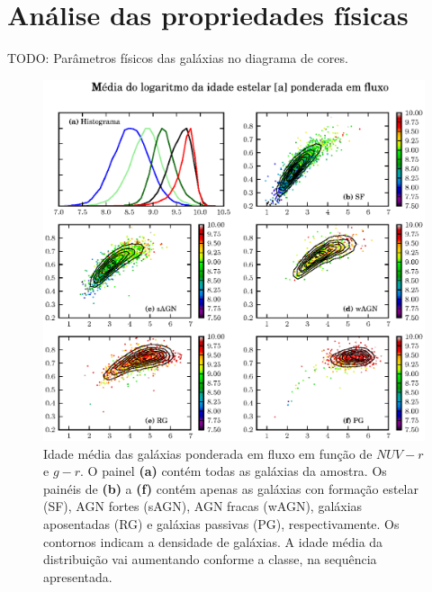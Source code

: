 \section{Análise das propriedades físicas}

TODO: Parâmetros físicos das galáxias no diagrama de cores.


\begin{figure}
	\includegraphics{figuras/uvcolor-color-at_flux-byclass.eps}
	\caption[Idade média das galáxias ponderada em fluxo no diagrama cor--cor UV.]
	{Idade média das galáxias ponderada em fluxo em função de $NUV-r$ e $g-r$. O
	painel \textbf{(a)} contém todas as galáxias da amostra. Os painéis de
	\textbf{(b)} a \textbf{(f)} contém apenas as galáxias con formação estelar
	(SF), AGN fortes (sAGN), AGN fracas (wAGN), galáxias aposentadas (RG) e
	galáxias passivas (PG), respectivamente. Os contornos indicam a densidade de
	galáxias. A idade média da distribuição vai aumentando conforme a classe, na
	sequência apresentada.}
	\label{fig:ATFluxColor}
\end{figure}

